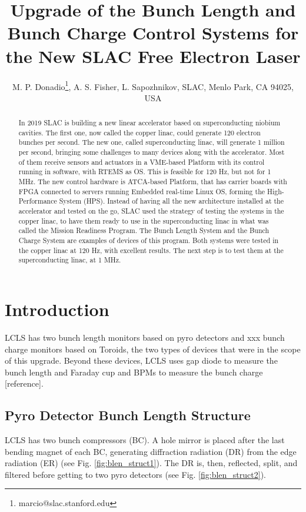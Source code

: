 \documentclass[letter,
        biblatex,   %
        keeplastbox,  %
        ]{jacow}
\begin{document}
\title{Upgrade of the Bunch Length and Bunch Charge Control Systems for the New SLAC Free Electron Laser}

\author{M. P. Donadio\thanks{marcio@slac.stanford.edu}, A. S. Fisher, L. Sapozhnikov, SLAC, Menlo Park, CA 94025, USA}
	
\maketitle


\begin{abstract}
In 2019 SLAC is building a new linear accelerator based on superconducting niobium cavities. The first one, now called the copper linac, could generate 120 electron bunches per second. The new one, called superconducting linac, will generate 1 million per second, bringing some challenges to many devices along with the accelerator. Most of them receive sensors and actuators in a VME-based Platform with its control running in software, with RTEMS as OS. This is feasible for 120 Hz, but not for 1 MHz. The new control hardware is ATCA-based Platform, that has carrier boards with FPGA connected to servers running Embedded real-time Linux OS, forming the High-Performance System (HPS). Instead of having all the new architecture installed at the accelerator and tested on the go, SLAC used the strategy of testing the systems in the copper linac, to have them ready to use in the superconducting linac in what was called the Mission Readiness Program. The Bunch Length System and the Bunch Charge System are examples of devices of this program. Both systems were tested in the copper linac at 120 Hz, with excellent results. The next step is to test them at the superconducting linac, at 1 MHz.
\end{abstract}


\section{Introduction}
LCLS has two bunch length monitors based on pyro detectors\cite{blen-pac07} and xxx bunch charge monitors based on Toroids, the two types of devices that were in the scope of this upgrade. Beyond these devices, LCLS uses gap diode to measure the bunch length\cite{injector-commissioning-2007} and Faraday cup and BPMs to measure the bunch charge [reference].

\subsection{Pyro Detector Bunch Length Structure}
LCLS has two bunch compressors (BC). A hole mirror is placed after the last bending magnet of each BC, generating diffraction radiation (DR) from the edge radiation (ER) (see Fig. \ref{fig:blen_struct1}). The DR is, then, reflected, split, and filtered before getting to two pyro detectors (see Fig. \ref{fig:blen_struct2}). \cite{blen-pac07}
\end{document}
